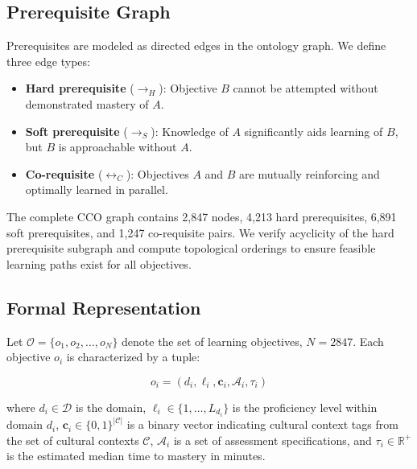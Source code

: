 \documentclass[11pt,a4paper]{article}
\begin{document}
\subsection{Prerequisite Graph}

Prerequisites are modeled as directed edges in the ontology graph.
We define three edge types:

\begin{itemize}[leftmargin=*]
    \item \textbf{Hard prerequisite} ($\rightarrow_H$): Objective $B$ cannot be attempted without demonstrated mastery of $A$.
    \item \textbf{Soft prerequisite} ($\rightarrow_S$): Knowledge of $A$ significantly aids learning of $B$, but $B$ is approachable without $A$.
    \item \textbf{Co-requisite} ($\leftrightarrow_C$): Objectives $A$ and $B$ are mutually reinforcing and optimally learned in parallel.
\end{itemize}

The complete CCO graph contains 2,847 nodes, 4,213 hard prerequisites, 6,891 soft prerequisites, and 1,247 co-requisite pairs.
We verify acyclicity of the hard prerequisite subgraph and compute topological orderings to ensure feasible learning paths exist for all objectives.

\subsection{Formal Representation}

Let $\mathcal{O} = \{o_1, o_2, \ldots, o_N\}$ denote the set of learning objectives, $N = 2847$.
Each objective $o_i$ is characterized by a tuple:

\begin{equation}
    o_i = (d_i, \ell_i, \mathbf{c}_i, \mathcal{A}_i, \tau_i)
\end{equation}

\noindent where $d_i \in \mathcal{D}$ is the domain, $\ell_i \in \{1, \ldots, L_{d_i}\}$ is the proficiency level within domain $d_i$, $\mathbf{c}_i \in \{0,1\}^{|\mathcal{C}|}$ is a binary vector indicating cultural context tags from the set of cultural contexts $\mathcal{C}$, $\mathcal{A}_i$ is a set of assessment specifications, and $\tau_i \in \mathbb{R}^+$ is the estimated median time to mastery in minutes.

\end{document}

